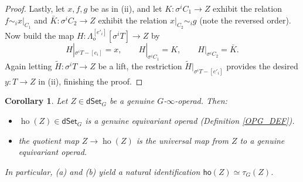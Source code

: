 \documentclass[a4paper,10pt
,draft
]{article}%
\numberwithin{equation}{section}
\numberwithin{figure}{section}
\newtheorem{corollary}[equation]{Corollary}%
\theoremstyle{definition} %
\newcommand{\1}{\ensuremath{\mathbbm 1}}%
\begin{document}
\begin{proof}
Lastly, let $x,f,g$ be as in (ii), 
and let
$K \colon \sigma^i C_1 \to Z$ exhibit the relation
$f \sim_i x|_{C_1}$
and 
$ \bar{K} \colon \sigma^i C_2 \to Z$
exhibit the relation
$x|_{C_2} \sim_i g$ (note the reversed order).
Now build the map
$H \colon \Lambda_o^{[e'_i]}[\sigma^i T] \to Z$ by
\[
	H|_{\sigma^i T - [e_i]} = x,
\qquad
	H|_{\sigma^i C_1} = K,
\qquad
	H|_{\sigma^i C_2} = \bar{K}.
\]
Again letting 
$\widetilde{H} \colon \sigma^i T \to Z$ be a lift,
the restriction 
$\widetilde{H}|_{\sigma^i T - [e'_i]}$
provides the desired $y \colon T \to Z$ in (ii),
finishing the proof.
\end{proof}



\begin{corollary}\label{HOOPUNIV COR}
Let $Z \in \mathsf{dSet}_G$ be a genuine $G$-$\infty$-operad. Then:
	\begin{itemize}
	\item[(a)] $\mathop{\mathrm{ho}}(Z) \in \mathsf{dSet}_G$ is a genuine equivariant operad
                (Definition \ref{OPG_DEF}).
	\item[(b)] the quotient map
	$Z \to \mathop{\mathrm{ho}}(Z)$ is the universal map from $Z$ to a genuine equivariant operad.
	\end{itemize}
In particular, (a) and (b) yield a natural identification
$
\mathsf{ho}(Z)
\simeq
\tau_G(Z)
$.
\end{corollary}
\end{document}
